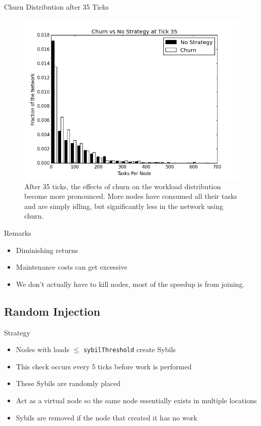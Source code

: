 \documentclass[11pt]{beamer}
\begin{document}
\begin{frame}{Churn Distribution after 35 Ticks}
\begin{figure}
	\centering
	\includegraphics[width=0.7\linewidth]{figs/ChurnStableHist35}
	\caption[Workload for churn at tick 35]{After 35 ticks, the effects of churn on the workload distribution become more pronounced.  More nodes have consumed all their tasks and are simply idling, but significantly less in the network using churn.}
	\label{fig:churnStableHist35}
\end{figure}
\end{frame}

\begin{frame}{Remarks}
\begin{itemize}
	\item Diminishing returns
	\item Maintenance costs can get excessive
	\item We don't actually have to kill nodes, most of the speedup is from joining.
\end{itemize}
\end{frame}


\subsection{Random Injection}
\begin{frame}{Strategy}
	\begin{itemize}
		
		\item Nodes with loads $ \leq $ \texttt{sybilThreshold} create Sybils
		\item This check occurs every 5 ticks before work is performed
		\item These Sybils are randomly placed
		\item Act as a virtual node so the same node essentially exists in multiple locations
		\item Sybils are removed if the node that created it has no work
		
	\end{itemize}
\end{frame}
\end{document}

